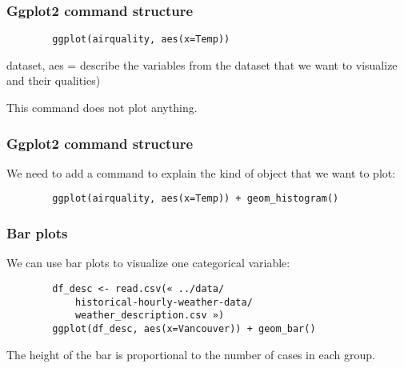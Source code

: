 \documentclass{beamer}
\begin{document}
	\begin{frame}[fragile]
		\frametitle{Ggplot2 command structure}

		\begin{exampleblock}{}
		\begin{center}
		\begin{BVerbatim}
		ggplot(airquality, aes(x=Temp))
		\end{BVerbatim}
		\end{center}
		\end{exampleblock}{}

dataset, aes = describe the variables from the dataset that we want to visualize and their qualities)

		This command does not plot anything.

	\end{frame}

	\begin{frame}[fragile]
		\frametitle{Ggplot2 command structure}

		We need to add a command to explain the kind of object that we want to plot:

		\begin{exampleblock}{}
		\begin{center}
		\begin{BVerbatim}
		ggplot(airquality, aes(x=Temp)) + geom_histogram()
		\end{BVerbatim}
		\end{center}
		\end{exampleblock}{}
		
	\end{frame}

	\begin{frame}[fragile]
		\frametitle{Bar plots}

		We can use bar plots to visualize one categorical variable:

		\begin{exampleblock}{}
		\begin{center}
		\begin{BVerbatim}
		df_desc <- read.csv(« ../data/
		    historical-hourly-weather-data/
		    weather_description.csv »)
		ggplot(df_desc, aes(x=Vancouver)) + geom_bar()
		\end{BVerbatim}
		\end{center}
		\end{exampleblock}{}

		The height of the bar is proportional to the number of cases in each group.
		
	\end{frame}
\end{document}

